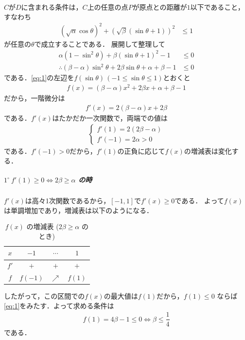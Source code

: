 \documentclass[../../main.tex]{subfiles}
\begin{document}
$C$が$D$に含まれる条件は，$C$上の任意の点$P$が原点との距離が$1$以下であること，
すなわち
\begin{align}
  (\sqrt{\alpha}\cos\theta)^2 + (\sqrt{\beta}(\sin\theta+1))^2 &\le 1
\end{align}
が任意の$\theta$で成立することである．
展開して整理して
\begin{align}
  \alpha (1 - \sin^2\theta) + \beta (\sin\theta+1)^2 - 1 &\le 0 \\
  \therefore
  (\beta - \alpha) \sin^2\theta + 2\beta \sin\theta + \alpha + \beta - 1 &\le 0 \label{eq:1}
\end{align}
である．\cref{eq:1}の左辺を$f(\sin\theta)\, (-1\le \sin\theta \le 1)$とおくと
\begin{align}
  f(x) = (\beta - \alpha) x^2 + 2\beta x + \alpha + \beta - 1 \label{eq:2}
\end{align}
だから，一階微分は
\begin{align}
  f'(x) = 2(\beta - \alpha)x + 2\beta \label{eq:3}
\end{align}
である．$f'(x)$はたかだか一次関数で，両端での値は
\begin{align}
  \begin{cases}
    f'(1) = 2(2\beta-\alpha) \\
    f'(-1) = 2\alpha >0
  \end{cases}
\end{align}
である．$f'(-1)>0$だから，$f'(1)$の正負に応じて$f(x)$の増減表は変化する．

\subparagraph{$1^\circ \ f'(1) \ge 0 \iff 2\beta \ge \alpha$ の時}

$f'(x)$は高々1次関数であるから，$[-1, 1]$で$f'(x) \ge 0$である．
よって$f(x)$は単調増加であり，増減表は以下のようになる．

\begin{table}[htb]
  \centering
  \caption{$f(x)$ の増減表 ($2\beta \ge \alpha$ のとき)}
  \renewcommand{\arraystretch}{1.4}
  \begin{tabular}{|c|c|c|c|}
    \hline
    $x$    & $-1$       & $\cdots$   & $1$       \\ \hline
    $f'$   & $+$        & $+$        & $+$       \\ \hline
    $f$    & $f(-1)$    & $\nearrow$ & $f(1)$    \\ \hline
  \end{tabular}
\end{table}

したがって，この区間での$f(x)$の最大値は$f(1)$だから，$f(1) \le 0$ ならば\cref{eq:1}をみたす．よって求める条件は
\begin{align}
  f(1) = 4\beta - 1 \le 0 \iff \beta \le \dfrac{1}{4} \label{eq:4}
\end{align}
である．
\end{document}
